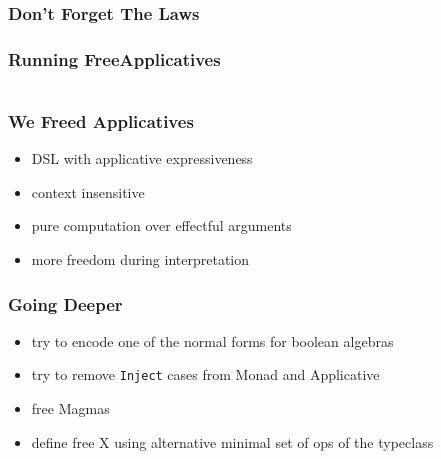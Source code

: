\documentclass{beamer}
\begin{document}
\begin{frame}
  \frametitle{Don't Forget The Laws}
\end{frame}

\begin{frame}
  \frametitle{Running FreeApplicatives}
  \inputminted{scala}{snippets/freeap-interp.scala}
\end{frame}

\begin{frame}
  \frametitle{We Freed Applicatives}
  \begin{itemize}
  \item DSL with applicative expressiveness
  \item context insensitive
  \item pure computation over effectful arguments
  \item more freedom during interpretation
  \end{itemize}
\end{frame}

\begin{frame}
  \frametitle{Going Deeper}
  \begin{itemize}
  \item try to encode one of the normal forms for boolean algebras
  \item try to remove \texttt{Inject} cases from Monad and Applicative
  \item free Magmas
  \item define free X using alternative minimal set of ops of the typeclass
  \end{itemize}
\end{frame}
\end{document}
